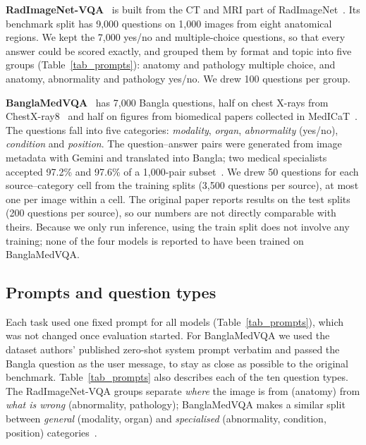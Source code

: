 \documentclass[doublecolumn]{ijcvsplatex}
\begin{document}
\textbf{RadImageNet-VQA}~\cite{butsanets2025radimagenetvqa} is built from the CT and MRI part of RadImageNet~\cite{mei2022radimagenet}. Its benchmark split has 9,000 questions on 1,000 images from eight anatomical regions. We kept the 7,000 yes/no and multiple-choice questions, so that every answer could be scored exactly, and grouped them by format and topic into five groups (Table~\ref{tab_prompts}): anatomy and pathology multiple choice, and anatomy, abnormality and pathology yes/no. We drew 100 questions per group.

\textbf{BanglaMedVQA}~\cite{ahmed2026banglamedvqa} has 7,000 Bangla questions, half on chest X-rays from ChestX-ray8~\cite{wang2017chestxray8} and half on figures from biomedical papers collected in MedICaT~\cite{subramanian2020medicat}. The questions fall into five categories: \emph{modality}, \emph{organ}, \emph{abnormality} (yes/no), \emph{condition} and \emph{position}. The question--answer pairs were generated from image metadata with Gemini and translated into Bangla; two medical specialists accepted 97.2\% and 97.6\% of a 1,000-pair subset~\cite{ahmed2026banglamedvqa}. We drew 50 questions for each source--category cell from the training splits (3,500 questions per source), at most one per image within a cell. The original paper reports results on the test splits (200 questions per source), so our numbers are not directly comparable with theirs. Because we only run inference, using the train split does not involve any training; none of the four models is reported to have been trained on BanglaMedVQA.

\subsection{Prompts and question types}
Each task used one fixed prompt for all models (Table~\ref{tab_prompts}), which was not changed once evaluation started. For BanglaMedVQA we used the dataset authors' published zero-shot system prompt verbatim and passed the Bangla question as the user message, to stay as close as possible to the original benchmark. Table~\ref{tab_prompts} also describes each of the ten question types. The RadImageNet-VQA groups separate \emph{where} the image is from (anatomy) from \emph{what is wrong} (abnormality, pathology); BanglaMedVQA makes a similar split between \emph{general} (modality, organ) and \emph{specialised} (abnormality, condition, position) categories~\cite{ahmed2026banglamedvqa}.
\end{document}
